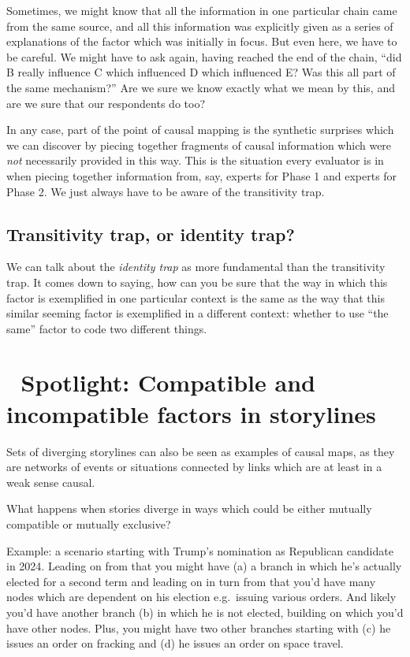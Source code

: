 \documentclass[
]{book}
\begin{document}
Sometimes, we might know that all the information in one particular chain came from the same source, and all this information was explicitly given as a series of explanations of the factor which was initially in focus. But even here, we have to be careful. We might have to ask again, having reached the end of the chain, ``did B really influence C which influenced D which influenced E? Was this all part of the same mechanism?'' Are we sure we know exactly what we mean by this, and are we sure that our respondents do too?

In any case, part of the point of causal mapping is the synthetic surprises which we can discover by piecing together fragments of causal information which were \emph{not} necessarily provided in this way. This is the situation every evaluator is in when piecing together information from, say, experts for Phase 1 and experts for Phase 2. We just always have to be aware of the transitivity trap.

\hypertarget{transitivity-trap-or-identity-trap}{%
\section{Transitivity trap, or identity trap?}\label{transitivity-trap-or-identity-trap}}

We can talk about the \emph{identity trap} as more fundamental than the transitivity trap. It comes down to saying, how can you be sure that the way in which this factor is exemplified in one particular context is the same as the way that this similar seeming factor is exemplified in a different context: whether to use ``the same'' factor to code two different things.

\hypertarget{spotlight-compatible-and-incompatible-factors-in-storylines}{%
\chapter{🧠 Spotlight: Compatible and incompatible factors in storylines}\label{spotlight-compatible-and-incompatible-factors-in-storylines}}

Sets of diverging storylines can also be seen as examples of causal maps, as they are networks of events or situations connected by links which are at least in a weak sense causal.

What happens when stories diverge in ways which could be either mutually compatible or mutually exclusive?

Example: a scenario starting with Trump's nomination as Republican candidate in 2024. Leading on from that you might have (a) a branch in which he's actually elected for a second term and leading on in turn from that you'd have many nodes which are dependent on his election e.g.~issuing various orders. And likely you'd have another branch (b) in which he is not elected, building on which you'd have other nodes. Plus, you might have two other branches starting with (c) he issues an order on fracking and (d) he issues an order on space travel.
\end{document}
